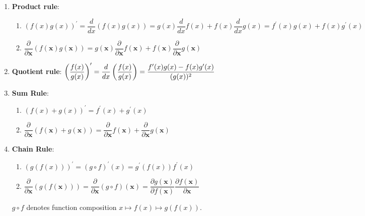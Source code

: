 \begin{enumerate}[series=vcalrules]
    \item \textbf{Product rule}:
    \begin{enumerate}
        \item $
            (f(x)g(x))^\prime
            = \dfrac{d}{dx}(f(x)g(x))
            = g(x)\dfrac{d}{dx}f(x) + f(x)\dfrac{d}{dx}g(x)
            = f^\prime(x)g(x) + f(x)g^\prime(x)
        $
        \hfill \cite{mfml/book/mml/Deisenroth-Faisal-Ong}

        \item $
            \dfrac{\partial}{\partial \bm{x}}(f(\bm{x})g(\bm{x}))
            = g(\bm{x})\dfrac{\partial}{\partial \bm{x}}f(\bm{x})
                + f(\bm{x})\dfrac{\partial}{\partial \bm{x}}g(\bm{x})
        $ \hfill \cite{mfml/book/mml/Deisenroth-Faisal-Ong}
    \end{enumerate}

    \item \textbf{Quotient rule}:
    $
        \left(\dfrac{f(x)}{g(x)}\right)^\prime
        = \dfrac{d}{dx}\left(\dfrac{f(x)}{g(x)}\right)
        = \dfrac{f^\prime(x)g(x) - f(x)g^\prime(x)}{(g(x))^2}
    $
    \hfill \cite{mfml/book/mml/Deisenroth-Faisal-Ong}

    \item \textbf{Sum Rule}:
    \begin{enumerate}
        \item $
            (f(x) + g(x))^\prime
            = f^\prime(x) + g^\prime(x)
        $
        \hfill \cite{mfml/book/mml/Deisenroth-Faisal-Ong}

        \item $
            \dfrac{\partial}{\partial \bm{x}}(f(\bm{x}) + g(\bm{x}))
            = \dfrac{\partial}{\partial \bm{x}}f(\bm{x})
                + \dfrac{\partial}{\partial \bm{x}}g(\bm{x})
        $
        \hfill \cite{mfml/book/mml/Deisenroth-Faisal-Ong}
    \end{enumerate}

    \item \textbf{Chain Rule}:
    \begin{enumerate}
        \item $
            (g(f(x)))^\prime
            = (g \circ f)^\prime(x)
            = g^\prime(f(x)) f^\prime(x)
        $
        \hfill \cite{mfml/book/mml/Deisenroth-Faisal-Ong}

        \item $
            \dfrac{\partial}{\partial \bm{x}}(g(f(\bm{x})))
            = \dfrac{\partial}{\partial \bm{x}}(g \circ f)(\bm{x})
            = \dfrac{\partial g(\bm{x})}{\partial f(\bm{x})}
                \dfrac{\partial f(\bm{x})}{\partial \bm{x}}
        $
        \hfill \cite{mfml/book/mml/Deisenroth-Faisal-Ong}
    \end{enumerate}
    $g \circ f$ denotes function composition $x \mapsto f (x) \mapsto g(f (x))$.
    \hfill \cite{mfml/book/mml/Deisenroth-Faisal-Ong}
\end{enumerate}

